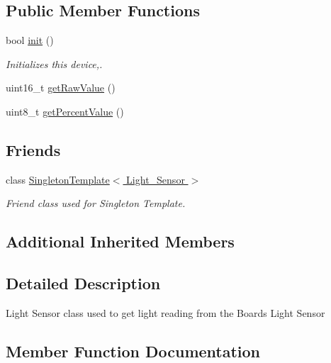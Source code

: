 \subsection*{Public Member Functions}
\begin{DoxyCompactItemize}
\item 
bool \hyperlink{classLight__Sensor_af991847909c0f4af7b92fae8e2028d61}{init} ()
\begin{DoxyCompactList}\small\item\em Initializes this device,. \end{DoxyCompactList}\item 
uint16\+\_\+t \hyperlink{classLight__Sensor_a0e491c2413a3a391989c30ebfef96d18}{get\+Raw\+Value} ()
\item 
uint8\+\_\+t \hyperlink{classLight__Sensor_a91e42027d38409b6dcf3ffc73f0dd0cd}{get\+Percent\+Value} ()
\end{DoxyCompactItemize}
\subsection*{Friends}
\begin{DoxyCompactItemize}
\item 
class \hyperlink{classLight__Sensor_a27b0e5f4de88754c9f4620bf0029f6de}{Singleton\+Template$<$ Light\+\_\+\+Sensor $>$}
\begin{DoxyCompactList}\small\item\em Friend class used for Singleton Template. \end{DoxyCompactList}\end{DoxyCompactItemize}
\subsection*{Additional Inherited Members}


\subsection{Detailed Description}
Light Sensor class used to get light reading from the Board\textquotesingle{}s Light Sensor 

\subsection{Member Function Documentation}
